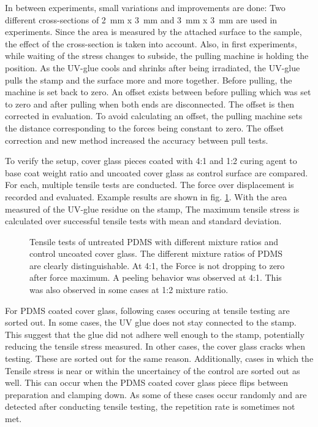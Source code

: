 In between experiments, small variations and improvements are done: Two different cross-sections of \SI{2}{\milli\meter} x \SI{3}{\milli\meter} and \SI{3}{\milli\meter} x \SI{3}{\milli\meter} are used in experiments. Since the area is measured by the attached surface to the sample, the effect of the cross-section is taken into account. Also, in first experiments, while waiting of the stress changes to subside, the pulling machine is holding the position. As the UV-glue cools and shrinks after being irradiated, the UV-glue pulls the stamp and the surface more and more together. Before pulling, the machine is set back to zero. An offset exists between before pulling which was set to zero and after pulling when both ends are disconnected. The offset is then corrected in evaluation. To avoid calculating an offset, the pulling machine sets the distance corresponding to the forces being constant to zero. The offset correction and new method increased the accuracy between pull tests.

To verify the setup, cover glass pieces coated with 4:1 and 1:2 curing agent to base coat weight ratio and uncoated cover glass as control surface are compared. For each, multiple tensile tests are conducted. The force over displacement is recorded and evaluated. Example results are shown in fig. \ref{fig:forceOverTime}. With the area measured of the UV-glue residue on the stamp, The maximum tensile stress is calculated over successful tensile tests with mean and standard deviation.  

\begin{figure}[hbt!]
	\centering
	
	\caption{Tensile tests of untreated PDMS with different mixture ratios and control uncoated cover glass. The different mixture ratios of PDMS are clearly distinguishable. At 4:1, the Force is not dropping to zero after force maximum. A peeling behavior was observed at 4:1. This was also observed in some cases at 1:2 mixture ratio.}
	\label{fig:forceOverTime}
\end{figure}

For PDMS coated cover glass, following cases occuring at tensile testing are sorted out. In some cases, the UV glue does not stay connected to the stamp. This suggest that the glue did not adhere well enough to the stamp, potentially reducing the tensile stress measured. In other cases, the cover glass cracks when testing. These are sorted out for the same reason. Additionally, cases in which the Tensile stress is near or within the uncertaincy of the control are sorted out as well. This can occur when the PDMS coated cover glass piece flips between preparation and clamping down. As some of these cases occur randomly and are detected after conducting tensile testing, the repetition rate is sometimes not met.

